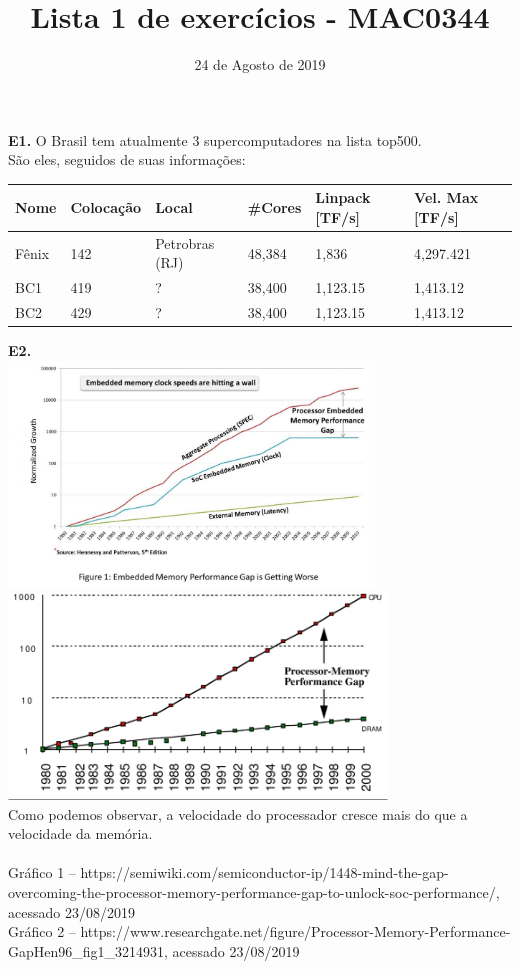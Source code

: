 \documentclass[12pt]{article}
\date{24 de Agosto de 2019}
\title{\vspace{-3.0cm}Lista 1 de exercícios - MAC0344}
\begin{document}
	\maketitle
	\noindent\textbf{E1.} O Brasil tem atualmente 3 supercomputadores na lista top500.\\
	São eles, seguidos de suas informações:\\
	\begin{table}[H]
		\begin{tabular}{|l|l|l|l|l|l|} \hline 
			Nome  & Colocação &Local & \#Cores & Linpack [TF/s] & Vel. Max [TF/s]\\ \hline
			Fênix & 142 & Petrobras (RJ) & 48,384 & 1,836 &  4,297.421\\ \hline
			BC1	  & 419 & ? & 38,400 & 1,123.15 & 1,413.12 \\ \hline
			BC2	  & 429 & ? & 38,400 & 1,123.15 & 1,413.12 \\ \hline
		\end{tabular} \vline 
	\end{table} 
	\noindent\textbf{E2.}\\
	\includegraphics[height=6cm]{graph-01} \\
	\includegraphics[height=5.5cm]{graph-02} \\
	Como podemos observar, a velocidade do processador cresce mais do que a velocidade da memória. \\\\
	
	Gráfico 1 – https://semiwiki.com/semiconductor-ip/1448-mind-the-gap-overcoming-the-processor-memory-performance-gap-to-unlock-soc-performance/, acessado 23/08/2019 \\
	
	Gráfico 2 –  https://www.researchgate.net/figure/Processor-Memory-Performance-GapHen96\_fig1\_3214931, acessado 23/08/2019
	
\end{document}
